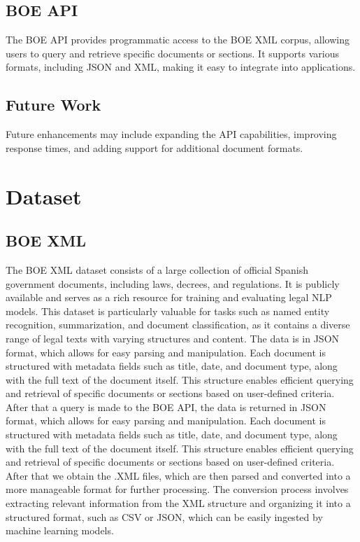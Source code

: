 \documentclass[conference]{IEEEtran}
\begin{document}
\subsection{BOE API}
The BOE API provides programmatic access to the BOE XML corpus, allowing users to query and retrieve specific documents or sections. It supports various formats, including JSON and XML, making it easy to integrate into applications.
\subsection{Future Work}
Future enhancements may include expanding the API capabilities, improving response times, and adding support for additional document formats.

\section{Dataset}
\subsection{BOE XML}
The BOE XML dataset consists of a large collection of official Spanish government documents, including laws, decrees, and regulations. It is publicly available and serves as a rich resource for training and evaluating legal NLP models.
This dataset is particularly valuable for tasks such as named entity recognition, summarization, and document classification, as it contains a diverse range of legal texts with varying structures and content.
The data is in JSON format, which allows for easy parsing and manipulation. Each document is structured with metadata fields such as title, date, and document type, along with the full text of the document itself. This structure enables efficient querying and retrieval of specific documents or sections based on user-defined criteria.
After that a query is made to the BOE API, the data is returned in JSON format, which allows for easy parsing and manipulation. Each document is structured with metadata fields such as title, date, and document type, along with the full text of the document itself. This structure enables efficient querying and retrieval of specific documents or sections based on user-defined criteria.
After that we obtain the .XML files, which are then parsed and converted into a more manageable format for further processing. The conversion process involves extracting relevant information from the XML structure and organizing it into a structured format, such as CSV or JSON, which can be easily ingested by machine learning models.
\end{document}
